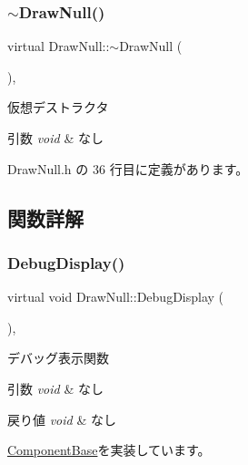 \subsubsection{\texorpdfstring{$\sim$\+Draw\+Null()}{~DrawNull()}}
{\footnotesize\ttfamily virtual Draw\+Null\+::$\sim$\+Draw\+Null (\begin{DoxyParamCaption}{ }\end{DoxyParamCaption})\hspace{0.3cm}{\ttfamily [inline]}, {\ttfamily [virtual]}}



仮想デストラクタ 


\begin{DoxyParams}{引数}
{\em void} & なし \\
\hline
\end{DoxyParams}


 Draw\+Null.\+h の 36 行目に定義があります。



\subsection{関数詳解}
\mbox{\label{class_draw_null_a2921257342eca07c8f6db4c475959f77}} 
\subsubsection{\texorpdfstring{Debug\+Display()}{DebugDisplay()}}
{\footnotesize\ttfamily virtual void Draw\+Null\+::\+Debug\+Display (\begin{DoxyParamCaption}{ }\end{DoxyParamCaption})\hspace{0.3cm}{\ttfamily [inline]}, {\ttfamily [virtual]}}



デバッグ表示関数 


\begin{DoxyParams}{引数}
{\em void} & なし \\
\hline
\end{DoxyParams}

\begin{DoxyRetVals}{戻り値}
{\em void} & なし \\
\hline
\end{DoxyRetVals}


\mbox{\hyperlink{class_component_base_a36ae7d27ad9d756fa245bad443020407}{Component\+Base}}を実装しています。



